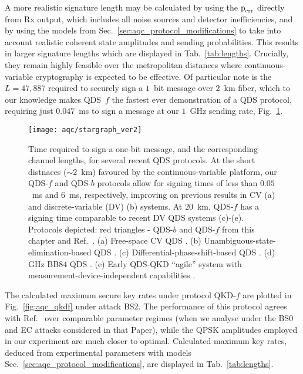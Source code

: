 A more realistic signature length may be calculated by using the $\text{p}_{\text{err}}$ directly from Rx output, which includes all noise sources and detector inefficiencies, and by using the models from Sec.~\ref{sec:aqc_protocol_modifications} to take into account realistic coherent state amplitudes and sending probabilities. This results in larger signature lengths which are displayed in Tab.~\ref{tab:lengths}. Crucially, they remain highly feasible over the metropolitan distances where continuous-variable cryptography is expected to be effective. Of particular note is the $L = 47,887$ required to securely sign a $1$~bit message over $2$~km fiber, which to our knowledge makes QDS~$f$ the fastest ever demonstration of a QDS protocol, requiring just $0.047$~ms to sign a message at our $1$~GHz sending rate, Fig.~\ref{fig:aqc_star}.

\begin{figure}[htp]
\captionsetup{width=0.8\linewidth}
\centering
\texttt{[image: aqc/stargraph\_ver2]}
\caption{\label{fig:aqc_star} Time required to sign a one-bit message, and the corresponding channel lengths, for several recent QDS protocols. At the short distnaces ($\sim 2$~km) favoured by the continuous-variable platform, our QDS-$f$ and QDS-$b$ protocols allow for signing times of less than $0.05$~ms and $6$~ms, respectively, improving on previous results in CV (a) and discrete-variable (DV) (b) systems. At $20$~km, QDS-$f$ has a signing time comparable to recent DV QDS systems (c)-(e). Protocols depicted: red triangles - QDS-$b$ and QDS-$f$ from this chapter and Ref.~\cite{Richter2020}. (a) Free-space CV QDS \cite{Croal2016}. (b) Unambiguous-state-elimination-based QDS \cite{Donaldson2016}. (c) Differential-phase-shift-based QDS \cite{Collins2016}. (d) GHz BB$84$ QDS \cite{An2019}. (e) Early QDS-QKD ``agile'' system with measurement-device-independent capabilities \cite{Roberts2017}.}
\end{figure}


The calculated maximum secure key rates under protocol QKD-$f$ are plotted in Fig.~\ref{fig:aqc_qkdf} under attack BS$2$. The performance of this protocol agrees with Ref.~\cite{Papanastasiou2018} over comparable parameter regimes (when we analyse under the BS$0$ and EC attacks considered in that Paper), while the QPSK amplitudes employed in our experiment are much closer to optimal. Calculated maximum key rates, deduced from experimental parameters with models Sec.~\ref{sec:aqc_protocol_modifications}, are displayed in Tab.~\ref{tab:lengths}.

